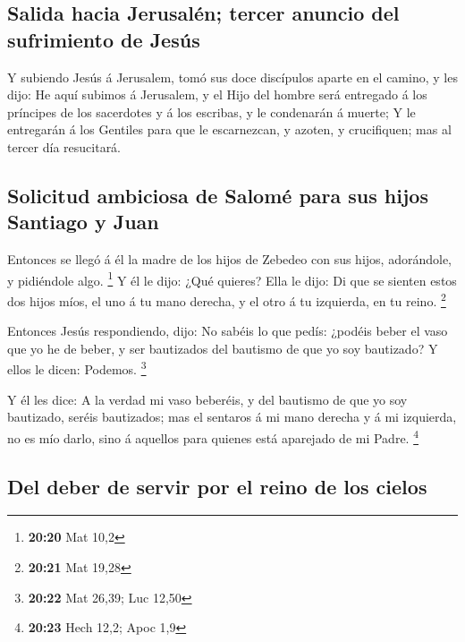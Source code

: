 \hypertarget{salida-hacia-jerusaluxe9n-tercer-anuncio-del-sufrimiento-de-jesuxfas}{%
\subsection{Salida hacia Jerusalén; tercer anuncio del sufrimiento de
Jesús}\label{salida-hacia-jerusaluxe9n-tercer-anuncio-del-sufrimiento-de-jesuxfas}}

 Y subiendo Jesús á Jerusalem, tomó sus doce discípulos
aparte en el camino, y les dijo:  He aquí subimos á
Jerusalem, y el Hijo del hombre será entregado á los príncipes de los
sacerdotes y á los escribas, y le condenarán á muerte;  Y
le entregarán á los Gentiles para que le escarnezcan, y azoten, y
crucifiquen; mas al tercer día resucitará.

\hypertarget{solicitud-ambiciosa-de-salomuxe9-para-sus-hijos-santiago-y-juan}{%
\subsection{Solicitud ambiciosa de Salomé para sus hijos Santiago y
Juan}\label{solicitud-ambiciosa-de-salomuxe9-para-sus-hijos-santiago-y-juan}}

 Entonces se llegó á él la madre de los hijos de Zebedeo
con sus hijos, adorándole, y pidiéndole algo. \footnote{\textbf{20:20}
  Mat 10,2}  Y él le dijo: ¿Qué quieres? Ella le dijo: Di
que se sienten estos dos hijos míos, el uno á tu mano derecha, y el otro
á tu izquierda, en tu reino. \footnote{\textbf{20:21} Mat 19,28}

 Entonces Jesús respondiendo, dijo: No sabéis lo que
pedís: ¿podéis beber el vaso que yo he de beber, y ser bautizados del
bautismo de que yo soy bautizado? Y ellos le dicen: Podemos. \footnote{\textbf{20:22}
  Mat 26,39; Luc 12,50}

 Y él les dice: A la verdad mi vaso beberéis, y del
bautismo de que yo soy bautizado, seréis bautizados; mas el sentaros á
mi mano derecha y á mi izquierda, no es mío darlo, sino á aquellos para
quienes está aparejado de mi Padre. \footnote{\textbf{20:23} Hech 12,2;
  Apoc 1,9}

\hypertarget{del-deber-de-servir-por-el-reino-de-los-cielos}{%
\subsection{Del deber de servir por el reino de los
cielos}\label{del-deber-de-servir-por-el-reino-de-los-cielos}}

